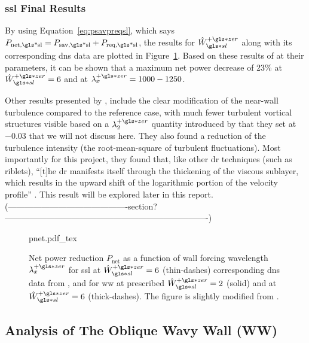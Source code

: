 \subsubsection{\gls{ssl} Final Results}
By using Equation~\eqref{eq:psavpreqsl}, which says $P_\text{net,\gls*{sl}}=P_\text{sav,\gls*{sl}}+P_\text{req,\gls*{sl}} $, the results for $\hat{W}\pz\ssl$ along with its corresponding \gls{dns} data are plotted in Figure~\ref{fig:pnet}. Based on these results of \textcite{viotti2009} at their parameters, it can be shown that a maximum net power decrease of 23\% at $\hat{W}\pz\ssl=6$ and at $\lambda_x\pz=1000-1250$.

Other results presented by \textcite{viotti2009}, include the clear modification of the near-wall turbulence compared to the reference case, with much fewer turbulent vortical structures visible based on a $\lambda_2\pz$ quantity introduced by \textcite{jeong1995} that they set at $-0.03$ that we will not discuss here. They also found a reduction of the turbulence intensity (the root-mean-square of turbulent fluctuations). Most importantly for this project, they found that, like other \gls{dr} techniques (such as riblets), ``[t]he \gls{dr} manifests itself through the thickening of the viscous sublayer, which results in the upward shift of the logarithmic portion of the velocity profile'' \cite{viotti2009}. This result will be explored later in this report. (-------------------------------------------section?-------------------------------------------------------------------------)

\begin{figure}[htbp]
	\centering
	\def\svgwidth{0.7\textwidth}
	{pnet.pdf_tex}
	\caption[$P_\text{net} $ for SSL and WW as a function of wall forcing wavelength $\lambda_x\pz$]{Net power reduction $P_\text{net}$ as a function of wall forcing wavelength $\lambda_x\pz$ for \gls{ssl} at $\hat{W}\pz\ssl=6$ (thin-dashes) corresponding \gls{dns} data from \textcite{viotti2009}, and for \gls{ww} at prescribed $\hat{W}\pz\ssl=2$ (solid) and at $\hat{W}\pz\ssl=6$ (thick-dashes). The figure is slightly modified from \cite{chernyshenko2013}.} 
	\label{fig:pnet}
\end{figure}

\subsection{Analysis of The Oblique Wavy Wall (WW)}\label{sec:ww}

